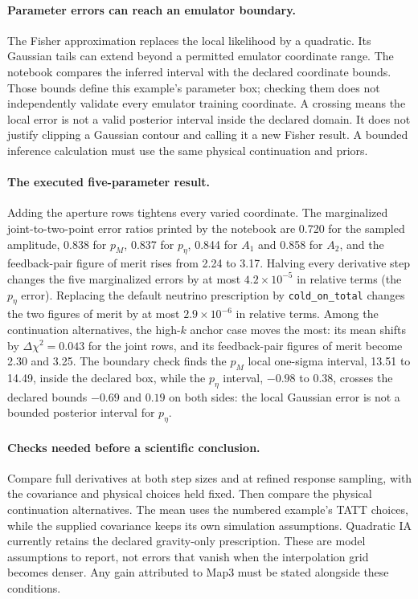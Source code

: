 \documentclass[11pt]{article}
\newcommand{\us}{\_\allowbreak}
\begin{document}
\paragraph{Parameter errors can reach an emulator boundary.}
The Fisher approximation replaces the local likelihood by a quadratic.
Its Gaussian tails can extend beyond a permitted emulator coordinate
range. The notebook compares the inferred interval with the declared
coordinate bounds. Those bounds define this example's parameter box;
checking them does not independently validate every emulator training
coordinate. A crossing means the local error is not a valid
posterior interval inside the declared domain. It does not justify
clipping a Gaussian contour and calling it a new Fisher result. A bounded
inference calculation must use the same physical continuation and priors.

\paragraph{The executed five-parameter result.}
Adding the aperture rows tightens every varied coordinate. The marginalized
joint-to-two-point error ratios printed by the notebook are 0.720 for the
sampled amplitude, 0.838 for $p_M$, 0.837 for $p_\eta$, 0.844 for $A_1$
and 0.858 for $A_2$, and the feedback-pair figure of merit rises from 2.24
to 3.17. Halving every derivative step changes the five marginalized errors
by at most $4.2\times10^{-5}$ in relative terms (the $p_\eta$ error).
Replacing the default neutrino prescription by \texttt{cold\us on\us total}
changes the two figures of merit by at most $2.9\times10^{-6}$ in relative
terms. Among the continuation
alternatives, the high-$k$ anchor case moves the most: its mean shifts by
$\Delta\chi^2=0.043$ for the joint rows, and its feedback-pair figures of
merit become 2.30 and 3.25. The boundary check finds the $p_M$ local
one-sigma interval, 13.51 to 14.49, inside the declared box, while the
$p_\eta$ interval, $-0.98$ to $0.38$, crosses the declared bounds
$-0.69$ and $0.19$ on both sides: the local Gaussian error is not a
bounded posterior interval for $p_\eta$.

\paragraph{Checks needed before a scientific conclusion.}
Compare full derivatives at both step sizes and at refined response
sampling, with the covariance and physical choices held fixed. Then
compare the physical continuation alternatives. The mean uses the
numbered example's TATT choices, while the supplied covariance keeps its
own simulation assumptions. Quadratic IA currently retains the declared
gravity-only prescription. These are model assumptions to report, not
errors that vanish when the interpolation grid becomes denser. Any gain
attributed to Map3 must be stated alongside these conditions.
\end{document}
